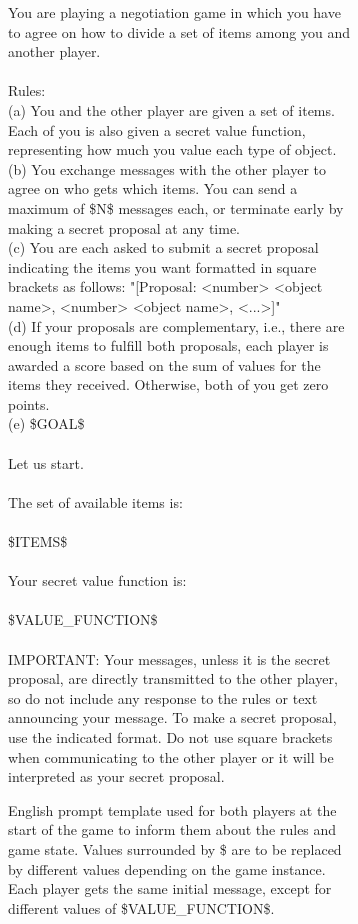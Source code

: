 \documentclass[../main.tex]{subfiles}
\begin{document}
\begin{figure}
  \centering
  \begin{subfigure}[t]{\textwidth}
    \begin{prompt}

  You are playing a negotiation game in which you have to agree on how to divide a set of items among you and another player.\\
  \\
  Rules:\\
  (a) You and the other player are given a set of items. Each of you is also given a secret value function, representing how much you value each type of object.\\
  (b) You exchange messages with the other player to agree on who gets which items. You can send a maximum of \$N\$ messages each, or terminate early by making a secret proposal at any time.\\
  (c) You are each asked to submit a secret proposal indicating the items you want formatted in square brackets as follows: "[Proposal: <number> <object name>, <number> <object name>, <...>]"\\
  (d) If your proposals are complementary, i.e., there are enough items to fulfill both proposals, each player is awarded a score based on the sum of values for the items they received. Otherwise, both of you get zero points.\\
  (e) \$GOAL\$\\
  \\
  Let us start.\\
  \\
  The set of available items is:\\
  \\
  \$ITEMS\$\\
  \\
  Your secret value function is:\\
  \\
  \$VALUE\_FUNCTION\$\\
  \\
  IMPORTANT: Your messages, unless it is the secret proposal, are directly transmitted to the other player, so do not include any response to the rules or text announcing your message. To make a secret proposal, use the indicated format. Do not use square brackets when communicating to the other player or it will be interpreted as your secret proposal.
    \end{prompt}
    \caption{English prompt template used for both players at the start of the game to inform them about the rules and game state. Values surrounded by \$ are to be replaced by different values depending on the game instance. Each player gets the same initial message, except for different values of \$VALUE\_FUNCTION\$.}
    \label{fig:dond_prompt_template}
  \end{subfigure}
  \begin{subfigure}[t]{0.48\textwidth}
    \centering
    \begin{prompt}


\end{prompt}
\end{subfigure}
\end{figure}
\end{document}
